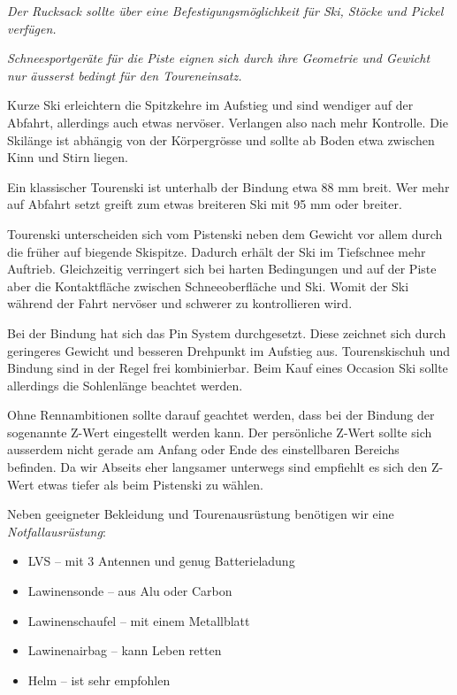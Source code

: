 \textit{Der Rucksack sollte über eine Befestigungsmöglichkeit für Ski, Stöcke und Pickel verfügen.}

\newcolumn

\textit{Schneesportgeräte für die Piste eignen sich durch ihre Geometrie und Gewicht nur äusserst bedingt für den Toureneinsatz.}

Kurze Ski erleichtern die Spitzkehre im Aufstieg und sind wendiger auf der Abfahrt, allerdings auch etwas nervöser.
Verlangen also nach mehr Kontrolle. Die Skilänge ist abhängig von der Körpergrösse und sollte ab Boden etwa zwischen Kinn und Stirn liegen.

Ein klassischer Tourenski ist unterhalb der Bindung etwa 88 mm breit.
Wer mehr auf Abfahrt setzt greift zum etwas breiteren Ski mit 95 mm oder breiter.

Tourenski unterscheiden sich vom Pistenski neben dem Gewicht vor allem durch die früher auf biegende Skispitze.
Dadurch erhält der Ski im Tiefschnee mehr Auftrieb.
Gleichzeitig verringert sich bei harten Bedingungen und auf der Piste aber die Kontaktfläche zwischen Schneeoberfläche und Ski.
Womit der Ski während der Fahrt nervöser und schwerer zu kontrollieren wird.

Bei der Bindung hat sich das Pin System durchgesetzt.
Diese zeichnet sich durch geringeres Gewicht und besseren Drehpunkt im Aufstieg aus.
Tourenskischuh und Bindung sind in der Regel frei kombinierbar.
Beim Kauf eines Occasion Ski sollte allerdings die Sohlenlänge beachtet werden.

Ohne Rennambitionen sollte darauf geachtet werden, dass bei der Bindung der sogenannte Z-Wert eingestellt werden kann.
Der persönliche Z-Wert sollte sich ausserdem nicht gerade am Anfang oder Ende des einstellbaren Bereichs befinden.
Da wir Abseits eher langsamer unterwegs sind empfiehlt es sich den Z-Wert etwas tiefer als beim Pistenski zu wählen.

Neben geeigneter Bekleidung und Tourenausrüstung benötigen wir eine \textit{Notfallausrüstung}:

\begin{itemize}
  \item{LVS -- mit 3 Antennen und genug Batterieladung}
  \item{Lawinensonde -- aus Alu oder Carbon}
  \item{Lawinenschaufel -- mit einem Metallblatt}
  \item{Lawinenairbag -- kann Leben retten}
  \item{Helm -- ist sehr empfohlen}
\end{itemize}

